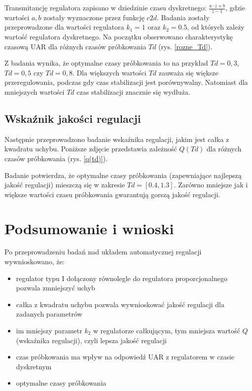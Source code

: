 \documentclass[12pt]{article}
\begin{document}

Transmitancję regulatora zapisano w dziedzinie czasu dyskretnego: $ \frac{a \cdot z +b}{z-1}$, gdzie wartości $a, b$ zostały wyznaczone przez funkcję $c2d$. Badania zostały przeprowadzone dla wartości regulatora $k_1 = 1$ oraz $k_2 = 0.5$, od których zależy wartość regulatora dyskretnego. Na początku obserwowano charakterystykę czasową UAR dla różnych czasów próbkowania $Td$ (rys. \ref{rozne_Td}).


Z badania wynika, że optymalne czasy próbkowania to na przykład $Td = 0,3$, $Td = 0,5$ czy $Td= 0,8$. Dla większych wartości $Td$ zauważa się większe przeregulowania, podczas gdy czas stabilizacji jest porównywalny. Natomiast dla mniejszych wartości $Td$ czas stabilizacji znacznie się wydłuża.

\subsection{Wskaźnik jakości regulacji}
Następnie przeprowadzono badanie wskaźnika regulacji, jakim jest całka z kwadratu uchybu. Poniższe zdjęcie przedstawia zależność $Q(Td)$ dla różnych czasów próbkowania (rys. \ref{q(td)}).



Badanie potwierdza, że optymalne czasy próbkowania (zapewniające najlepszą jakość regulacji) mieszczą się w zakresie $Td = [0.4, 1.3]$. Zarówno mniejsze jak i większe wartości czasu próbkowania gwarantują gorszą jakość regulacji.

\section{Podsumowanie i wnioski}
Po przeprowadzeniu badań nad układem automatycznej regulacji wywnioskowano, że:
\begin{itemize}
    \item regulator typu I dołączony równolegle do regulatora proporcjonalnego pozwala zmniejszyć uchyb
    \item całka z kwadratu uchybu pozwala wywnioskować jakość regulacji dla zadanych parametrów
    \item im mniejszy parametr $k_2$ w regulatorze całkującym, tym mniejsza wartość $Q$ (wskaźnika regulacji), czyli lepsza jakość regulacji
    \item czas próbkowania ma wpływ na odpowiedź UAR z regulatorem w czasie dyskretnym
    \item optymalne czasy próbkowania 
\end{itemize}
\end{document}
